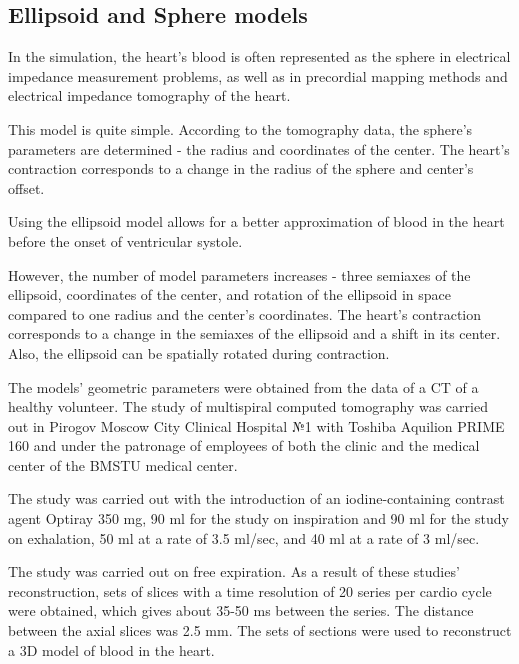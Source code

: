 \documentclass[conference]{IEEEtran}
\begin{document}
\subsection{Ellipsoid and Sphere models}


In the simulation, the heart's blood is often represented as the sphere in
electrical impedance measurement problems,
as well as in precordial mapping methods and electrical impedance tomography of
the heart. 

This model is quite simple. According to the tomography data, the sphere's
parameters are determined - the radius and coordinates of the center. The
heart's contraction corresponds to a change in the radius of the sphere and
center's offset.

Using the ellipsoid model allows for a better approximation of blood in the
heart before the onset of ventricular systole. 

However, the number of model parameters increases - three semiaxes of the
ellipsoid, coordinates of the center, and rotation of the ellipsoid in space
compared to one radius and the center's coordinates. The heart's contraction
corresponds to a change in the semiaxes of the ellipsoid and a shift in its
center. Also, the ellipsoid can be spatially rotated during contraction. 

The models' geometric parameters were obtained from the data of a CT of a
healthy volunteer. The study of multispiral computed tomography was carried out
in Pirogov Moscow City Clinical Hospital №1  with  Toshiba Aquilion PRIME 160
and under the patronage of employees of both the clinic and the medical center
of the BMSTU medical center. 

The study was carried out with the introduction of an iodine-containing contrast
agent Optiray 350 mg, 90 ml for the study on inspiration and 90 ml for the study
on exhalation, 50 ml at a rate of 3.5 ml/sec, and 40 ml at a rate of 3 ml/sec. 

The study was carried out on free expiration. As a result of these studies'
reconstruction, sets of slices with a time resolution of 20 series per cardio
cycle were obtained, which gives about 35-50 ms between the series. The distance
between the axial slices was 2.5 mm. The sets of sections were used to
reconstruct a 3D model of blood in the heart. 
\end{document}
